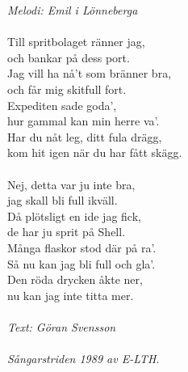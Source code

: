 {\footnotesize\textit{Melodi: Emil i Lönneberga}}\\
\\
Till spritbolaget ränner jag,\\
och bankar på dess port.\\
Jag vill ha nå't som bränner bra,\\
och får mig skitfull fort.\\
Expediten sade goda',\\
hur gammal kan min herre va'.\\
Har du nåt leg, ditt fula drägg,\\
kom hit igen när du har fått skägg.\\
\\
Nej, detta var ju inte bra,\\
jag skall bli full ikväll.\\
Då plötsligt en ide jag fick,\\
de har ju sprit på Shell.\\
Många flaskor stod där på ra'.\\
Så nu kan jag bli full och gla’.\\
Den röda drycken åkte ner,\\
nu kan jag inte titta mer.\\
\\
{\footnotesize\textit{Text: Göran Svensson \\ \\ Sångarstriden 1989 av
    E-LTH.}}
